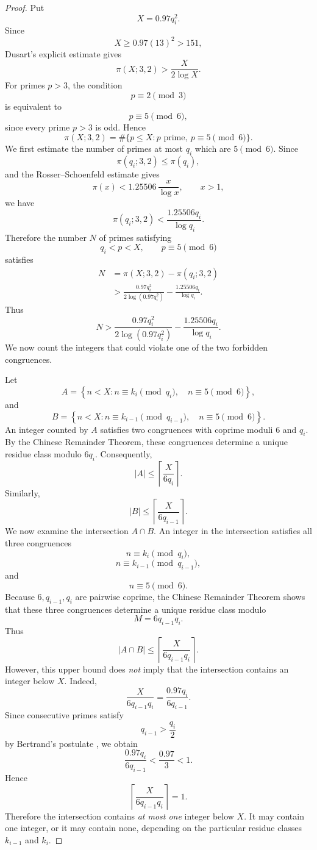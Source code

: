 \documentclass[11pt,a4paper]{article}
\theoremstyle{definition}
\theoremstyle{remark}
\begin{document}
\begin{proof}
Put
\[
X=0.97q_i^2.
\]
Since
\[
X\ge0.97(13)^2>151,
\]
Dusart's explicit estimate gives \cite{dusart2002}
\[
\pi(X;3,2)>\frac{X}{2\log X}.
\]
For primes \(p>3\), the condition
\[
p\equiv2\pmod3
\]
is equivalent to
\[
p\equiv5\pmod6,
\]
since every prime \(p>3\) is odd. Hence
\[
\pi(X;3,2)
=
\#\{p\le X:p\text{ prime},\ p\equiv5\pmod6\}.
\]
We first estimate the number of primes at most \(q_i\) which are
\(5\pmod6\). Since
\[
\pi(q_i;3,2)\le\pi(q_i),
\]
and the Rosser--Schoenfeld estimate \cite{rosserSchoenfeld1962} gives
\[
\pi(x)<1.25506\,\frac{x}{\log x},
\qquad x>1,
\]
we have
\[
\pi(q_i;3,2)
<
\frac{1.25506q_i}{\log q_i}.
\]
Therefore the number \(N\) of primes satisfying
\[
q_i<p<X,
\qquad
p\equiv5\pmod6
\]
satisfies
\[
\begin{aligned}
N
&=\pi(X;3,2)-\pi(q_i;3,2)\\
&>
\frac{0.97q_i^2}
{2\log(0.97q_i^2)}
-\frac{1.25506q_i}{\log q_i}.
\end{aligned}
\]
Thus
\[
\boxed{
N>
\frac{0.97q_i^2}
{2\log(0.97q_i^2)}
-\frac{1.25506q_i}{\log q_i}.
}
\]
We now count the integers that could violate one of the two forbidden
congruences.

Let
\[
A=
\left\{
n<X:
n\equiv k_i\pmod{q_i},
\quad
n\equiv5\pmod6
\right\},
\]
and
\[
B=
\left\{
n<X:
n\equiv k_{i-1}\pmod{q_{i-1}},
\quad
n\equiv5\pmod6
\right\}.
\]
An integer counted by \(A\) satisfies two congruences with coprime
moduli \(6\) and \(q_i\). By the Chinese Remainder Theorem, these
congruences determine a unique residue class modulo \(6q_i\).
Consequently,
\[
|A|
\le
\left\lceil\frac{X}{6q_i}\right\rceil.
\]
Similarly,
\[
|B|
\le
\left\lceil\frac{X}{6q_{i-1}}\right\rceil.
\]
We now examine the intersection \(A\cap B\). An integer in the
intersection satisfies all three congruences
\[
n\equiv k_i\pmod{q_i},
\]
\[
n\equiv k_{i-1}\pmod{q_{i-1}},
\]
and
\[
n\equiv5\pmod6.
\]
Because \(6,q_{i-1},q_i\) are pairwise coprime, the Chinese Remainder
Theorem shows that these three congruences determine a unique residue
class modulo
\[
M=6q_{i-1}q_i.
\]
Thus
\[
|A\cap B|
\le
\left\lceil
\frac{X}{6q_{i-1}q_i}
\right\rceil.
\]
However, this upper bound does \emph{not} imply that the intersection
contains an integer below \(X\). Indeed,
\[
\frac{X}{6q_{i-1}q_i}
=
\frac{0.97q_i}{6q_{i-1}}.
\]
Since consecutive primes satisfy
\[
q_{i-1}>\frac{q_i}{2}
\]
by Bertrand's postulate \cite{chebyshev1852}, we obtain
\[
\frac{0.97q_i}{6q_{i-1}}
<
\frac{0.97}{3}
<1.
\]
Hence
\[
\left\lceil
\frac{X}{6q_{i-1}q_i}
\right\rceil=1.
\]
Therefore the intersection contains \emph{at most one} integer below
\(X\). It may contain one integer, or it may contain none, depending on
the particular residue classes \(k_{i-1}\) and \(k_i\).


\end{proof}
\end{document}

